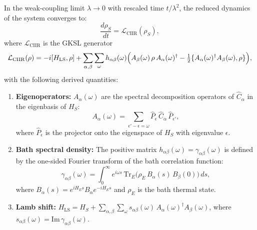 \begin{theorem}
\label{thm:c9:davies}
In the weak-coupling limit $\lambda \to 0$ with rescaled time $t/\lambda^2$,
the reduced dynamics of the system converges to:
\begin{equation}
  \frac{d\rho_S}{dt} = \mathcal{L}_{\mathrm{CIIR}}(\rho_S),
\end{equation}
where $\mathcal{L}_{\mathrm{CIIR}}$ is the GKSL generator
\begin{equation}
  \mathcal{L}_{\mathrm{CIIR}}(\rho) =
    -i[H_{\mathrm{LS}}, \rho]
    + \sum_{\alpha,\beta} \sum_\omega
      h_{\alpha\beta}(\omega) \Bigl(
        A_\beta(\omega)\, \rho\, A_\alpha(\omega)^\dagger
        - \tfrac{1}{2}\{A_\alpha(\omega)^\dagger A_\beta(\omega), \rho\}
      \Bigr),
  \label{eq:c9:ciir_gen}
\end{equation}
with the following derived quantities:
\begin{enumerate}
\item[(i)] \textbf{Eigenoperators:}  $A_\alpha(\omega)$ are the spectral
  decomposition operators of $\hat{C}_\alpha$ in the eigenbasis of $H_S$:
  \begin{equation}
    A_\alpha(\omega) = \sum_{\epsilon' - \epsilon = \omega}
      \hat{P}_\epsilon\, \hat{C}_\alpha\, \hat{P}_{\epsilon'},
    \label{eq:c9:eigenop}
  \end{equation}
  where $\hat{P}_\epsilon$ is the projector onto the eigenspace of $H_S$
  with eigenvalue $\epsilon$.
\item[(ii)] \textbf{Bath spectral density:}  The positive matrix
  $h_{\alpha\beta}(\omega) = \gamma_{\alpha\beta}(\omega)$ is defined by
  the one-sided Fourier transform of the bath correlation function:
  \begin{equation}
    \gamma_{\alpha\beta}(\omega) = \int_0^\infty e^{i\omega s}\,
      \mathrm{Tr}_E\bigl(
        \rho_E\, B_\alpha(s)\, B_\beta(0)
      \bigr)\, ds,
    \label{eq:c9:spectral}
  \end{equation}
  where $B_\alpha(s) = e^{iH_E s} B_\alpha e^{-iH_E s}$ and
  $\rho_E$ is the bath thermal state.
\item[(iii)] \textbf{Lamb shift:}  $H_{\mathrm{LS}} = H_S + \sum_{\alpha,\beta}
  \sum_\omega s_{\alpha\beta}(\omega)\, A_\alpha(\omega)^\dagger A_\beta(\omega)$,
  where $s_{\alpha\beta}(\omega) = \mathrm{Im}\,\gamma_{\alpha\beta}(\omega)$.
\end{enumerate}
\end{theorem}

